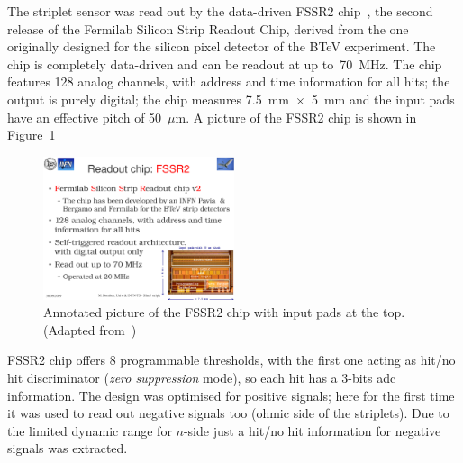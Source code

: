 The striplet sensor was read out by the data-driven FSSR2 chip~\cite{Re:2006zw}, 
the second release of the Fermilab Silicon Strip Readout Chip, derived from the one originally designed 
for the silicon pixel detector of the BTeV experiment. The chip is completely data-driven and can be 
readout at up to~70~MHz. The chip features 128 analog channels, with address and time information 
for all hits; the output is purely digital; the chip measures 7.5~mm~$\times$~5~mm and the input pads have an effective pitch of 50~$\mu$m. A picture of the FSSR2 chip is shown in Figure~\ref{fig:fssr2}
\begin{figure}[!htpb]
\centering
\includegraphics[width=0.5\textwidth]{fssr2.pdf}
\caption{\label{fig:fssr2}Annotated picture of the FSSR2 chip with input pads at the top. (Adapted from~\cite{Re:2006zw})}
\end{figure}


FSSR2 chip offers 8 programmable thresholds, with the first one acting as hit/no hit discriminator
({\it zero suppression} mode), 
so each hit has a 3-bits adc information. The design was optimised for positive signals; 
here for the first time it was used to read out negative signals too (ohmic side of the striplets). 
Due to the limited dynamic range for $n$-side just a hit/no hit information for negative signals was 
extracted.

